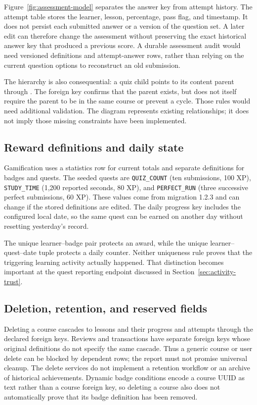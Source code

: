 \documentclass[12pt,a4paper,oneside]{report}
\begin{document}
\assessmentmodeldiagram

Figure~\ref{fig:assessment-model} separates the answer key from attempt history.
The attempt table stores the learner, lesson, percentage, pass flag, and timestamp.
It does not persist each submitted answer or a version of the question set. A later
edit can therefore change the assessment without preserving the exact historical
answer key that produced a previous score. A durable assessment audit would need
versioned definitions and attempt-answer rows, rather than relying on the current
question options to reconstruct an old submission.

The hierarchy is also consequential: a quiz child points to its content parent
through . The foreign key confirms that the parent exists,
but does not itself require the parent to be in the same course or prevent a cycle.
Those rules would need additional validation. The diagram represents existing
relationships; it does not imply those missing constraints have been implemented.

\subsection{Reward definitions and daily state}
Gamification uses a statistics row for current totals and separate definitions for
badges and quests. The seeded quests are \texttt{QUIZ\_COUNT} (ten submissions,
100 XP), \texttt{STUDY\_TIME} (1,200 reported seconds, 80 XP), and
\texttt{PERFECT\_RUN} (three successive perfect submissions, 60 XP).
These values come from migration 1.2.3 and can change if the stored definitions are
edited. The daily progress key includes the configured local date, so the same quest
can be earned on another day without resetting yesterday's record.

\rewardmodeldiagram

The unique learner--badge pair protects an award, while the unique
learner--quest--date tuple protects a daily counter. Neither uniqueness rule proves
that the triggering learning activity actually happened. That distinction becomes
important at the quest reporting endpoint discussed in
Section~\ref{sec:activity-trust}.

\subsection{Deletion, retention, and reserved fields}
Deleting a course cascades to lessons and their progress and attempts through the
declared foreign keys. Reviews and transactions have separate foreign keys whose
original definitions do not specify the same cascade. Thus a generic course or user
delete can be blocked by dependent rows; the report must not promise universal
cleanup. The delete services do not implement a retention workflow or an archive of
historical achievements. Dynamic badge conditions encode a course UUID as text
rather than a course foreign key, so deleting a course also does not automatically
prove that its badge definition has been removed.
\end{document}
